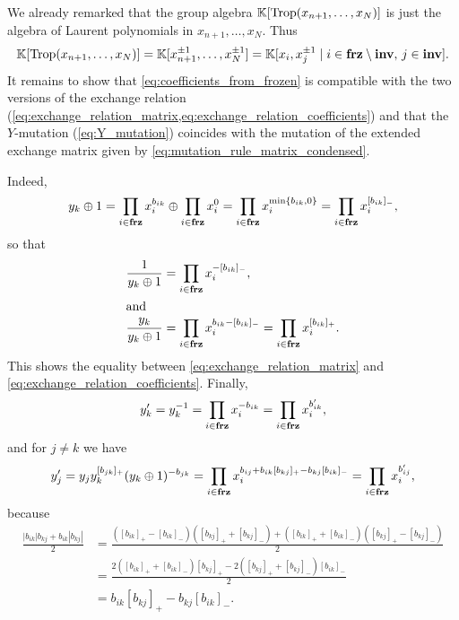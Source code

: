 We already remarked that the group algebra $\mathbb{K}[\operatorname{Trop}(x_{n+1}, \dots, x_{N})]$ is just
the algebra of Laurent polynomials in $x_{n+1}, \dots, x_N$. Thus
\begin{equation*}
	\mathbb{K}[\operatorname{Trop}(x_{n+1}, \dots, x_N)] = \mathbb{K}[x_{n+1}^{\pm 1}, \dots, x_N^{\pm 1}] = \mathbb{K}[x_i, x_j^{\pm 1} \mid i \in \mathbf{frz} \setminus \mathbf{inv},\,j \in \mathbf{inv}].
\end{equation*}
%
It remains to show that \cref{eq:coefficients_from_frozen} is compatible with the two
versions of the exchange relation
(\cref{eq:exchange_relation_matrix,eq:exchange_relation_coefficients}) and that the
$Y$-mutation (\cref{eq:Y_mutation}) coincides with the mutation of the extended
exchange matrix given by \cref{eq:mutation_rule_matrix_condensed}.

Indeed,
\begin{equation*}
	y_k \oplus 1 = \prod_{i \in \mathbf{frz}} x_i^{b_{ik}} \oplus \prod_{i \in \mathbf{frz}} x_i^0 = \prod_{i \in \mathbf{frz}}x_i^{\min\{b_{ik}, 0\}} = \prod_{i \in \mathbf{frz}} x_i^{[b_{ik}]_{-}},
\end{equation*}
so that
\begin{align*}
	\frac{1}{y_k \oplus 1}   & = \prod_{i \in \mathbf{frz}} x_i^{-[b_{ik}]_{-}},                                                 \\
	\shortintertext{and}
	\frac{y_k}{y_k \oplus 1} & = \prod_{i \in \mathbf{frz}} x_i^{b_{ik} - [b_{ik}]_{-}} = \prod_{i \in \mathbf{frz}} x_i^{[b_{ik}]_{+}}.
\end{align*}
%
This shows the equality between \cref{eq:exchange_relation_matrix} and
\cref{eq:exchange_relation_coefficients}. Finally,
\begin{equation*}
	y_k' = y_k^{-1} = \prod_{i \in \mathbf{frz}}x_i^{-b_{ik}} = \prod_{i \in \mathbf{frz}}x_i^{b'_{ik}},
\end{equation*}
and for $j\neq k$ we have
\begin{equation*}
	y'_j = y_j y_k^{[b_{jk}]_{+}}(y_k \oplus 1)^{-b_{jk}} = \prod_{i \in \mathbf{frz}}x_i^{b_{ij} + b_{ik}[b_{kj}]_{+} - b_{kj}[b_{ik}]_{-}} = \prod_{i \in \mathbf{frz}}x_i^{b'_{ij}},
\end{equation*}
%
because
\begin{align*}
	\frac{|b_{ik}|b_{kj} + b_{ik}|b_{kj}|}{2}
	 & =\frac{([b_{ik}]_{+} - [b_{ik}]_{-})([b_{kj}]_{+} + [b_{kj}]_{-}) + ([b_{ik}]_{+} + [b_{ik}]_{-})([b_{kj}]_{+} - [b_{kj}]_{-})}{2} \\
	 & =\frac{2([b_{ik}]_{+} + [b_{ik}]_{-})[b_{kj}]_{+} - 2([b_{kj}]_{+} + [b_{kj}]_{-})[b_{ik}]_{-}}{2}                                 \\
	 & =  b_{ik}[b_{kj}]_{+} - b_{kj}[b_{ik}]_{-}.
\end{align*}

